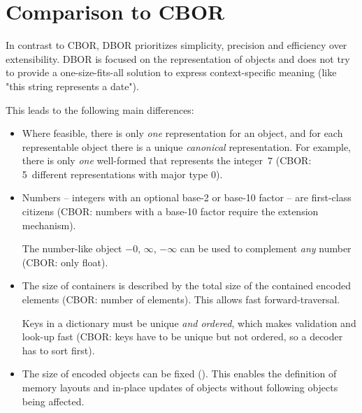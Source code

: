
\section{Comparison to CBOR}
\label{sec:comparisontocbor}

In contrast to CBOR, DBOR prioritizes simplicity, precision and efficiency over extensibility.
DBOR is focused on the representation of objects and does not try to provide a one-size-fits-all solution
to express context-specific meaning (like "this string represents a date").

\medskip
\begin{BeginParPenalty}
    This leads to the following main differences:
    \begin{itemize}
        \item
        Where feasible, there is only \emph{one} representation for an object,
        and for each representable object there is a unique \emph{canonical} representation.
        For example, there is only \emph{one} well-formed \DborIntegerValue{} that represents the integer~$7$
        (CBOR: 5~different representations with major type 0).

        \item
        Numbers -- integers with an optional base-2 or base-10 factor -- are first-class citizens
        (CBOR: numbers with a base-10 factor require the extension mechanism).

        The number-like object $-0$, $\infty$, $-\infty$ can be used to complement \emph{any} number
        (CBOR: only float).

        \item
        The size of containers is described by the total size of the contained encoded elements
        (CBOR: number of elements). This allows fast forward-traversal.

        Keys in a dictionary must be unique \emph{and ordered}, which makes validation and look-up fast
        (CBOR: keys have to be unique but not ordered, so a decoder has to sort first).

        \item
        The size of encoded objects can be fixed (\DborAllocatorValue).
        This enables the definition of memory layouts and in-place updates of objects without
        following objects being affected.
    \end{itemize}
\end{BeginParPenalty}


